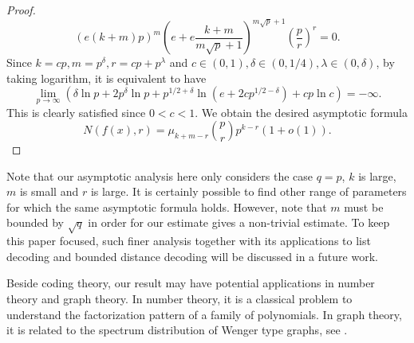 \documentclass[reqno]{amsart}
\theoremstyle{remark}
\numberwithin{equation}{section}
\begin{document}
\begin{proof}
\[{ (e(k+m)p)^{m}(e+e\frac {k+m}{m\sqrt{p}+1})^{m\sqrt{p}+1}}{(\frac pr)^r}=0.\]
 Since $k=cp, m=p^{\delta}, r=cp+p^\lambda$ and $c\in(0, 1), \delta\in(0, 1/4), \lambda\in(0, \delta)$, by taking logarithm, it is equivalent to have
  \[\lim_{p\rightarrow\infty}\left({\delta\ln p+2p^\delta \ln p+ p^{1/2+\delta}\ln (e+2cp^{1/2-\delta})}+{cp \ln c}\right)=-\infty.\]
This is clearly satisfied since $0<c<1$. We obtain the desired
asymptotic formula
 $$N(f(x), r)=\mu_{k+m-r}{p \choose r}p^{k-r}(1+o(1)).$$
\end{proof}

Note that our asymptotic analysis here only considers the case $q=p$, $k$ is large, $m$ is small and $r$ is large.  It is certainly possible to find other range of parameters for which the same asymptotic formula holds. However, note that $m$ must be bounded by $\sqrt{q}$ in order for our estimate gives a non-trivial estimate. To keep this paper focused, such finer analysis together with its applications to list decoding and bounded distance decoding will be
discussed in a future work.

Beside coding theory, our result may have potential applications in number theory and graph theory. In number theory, it is a classical problem to
understand the factorization pattern of a family of polynomials.  In graph theory, it is related to the spectrum distribution of Wenger type graphs,
see \cite{CLWW}.
\end{document}
